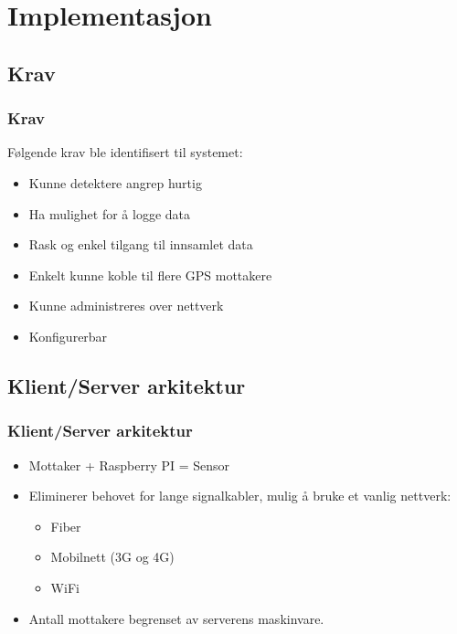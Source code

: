 \documentclass[xcolor=table]{beamer}
\begin{document}
\section{Implementasjon}
\subsection{Krav}
\begin{frame}
  \frametitle{Krav}
  Følgende krav ble identifisert til systemet:
  \begin{itemize}
    \item Kunne detektere angrep hurtig
    \item Ha mulighet for å logge data
    \item Rask og enkel tilgang til innsamlet data
    \item Enkelt kunne koble til flere GPS mottakere
    \item Kunne administreres over nettverk
    \item Konfigurerbar 
  \end{itemize}
\end{frame}

\subsection{Klient/Server arkitektur}
\begin{frame}
  \frametitle{Klient/Server arkitektur}
  \begin{itemize}
    \item Mottaker + Raspberry PI = Sensor
    \item Eliminerer behovet for lange signalkabler, mulig å bruke et vanlig nettverk:
    \begin{itemize}
      \item Fiber
      \item Mobilnett (3G og 4G)
      \item WiFi
    \end{itemize}
    \item Antall mottakere begrenset av serverens maskinvare.
  \end{itemize}
\end{frame}
\end{document}
